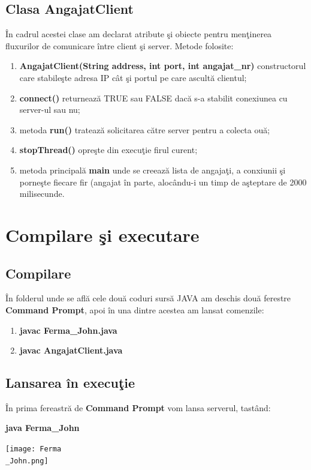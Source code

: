 \documentclass[12pt,a4paper]{article}
\begin{document}
\subsection{Clasa AngajatClient}
	\^{I}n cadrul acestei clase am declarat atribute \c{s}i obiecte pentru men\c{t}inerea fluxurilor de comunicare \^{i}ntre client \c{s}i server.
	Metode folosite:
	\begin{enumerate}
		\item \textbf{AngajatClient(String address, int port, int angajat\_nr)} constructorul care stabile\c{s}te adresa IP c\^{a}t \c{s}i portul pe care ascult\u{a} clientul;
		\item \textbf{connect()} returneaz\u{a} TRUE sau FALSE dac\u{a} s-a stabilit conexiunea cu server-ul sau nu;
		\item metoda \textbf{run()} trateaz\u{a} solicitarea c\u{a}tre server pentru a colecta ou\u{a};
		\item \textbf{stopThread()} opre\c{s}te din execu\c{t}ie firul curent;
		\item metoda principal\u{a} \textbf{main} unde se creeaz\u{a} lista de angaja\c{t}i, a conxiunii \c{s}i porne\c{s}te fiecare fir (angajat \^{i}n parte, aloc\^{a}ndu-i un timp de a\c{s}teptare de 2000 milisecunde.
	\end{enumerate}
	
\section{Compilare \c{s}i executare}
\subsection{Compilare}
	\^{I}n folderul unde se afl\u{a} cele dou\u{a} coduri surs\u{a} JAVA am deschis dou\u{a} ferestre \textbf{Command Prompt}, apoi \^{i}n una dintre acestea am lansat comenzile:
	\begin{enumerate}
		\item \textbf{javac Ferma\_John.java}
		\item \textbf{javac AngajatClient.java}
	\end{enumerate}
	
\subsection{Lansarea \^{i}n execu\c{t}ie}
	\^{I}n prima fereastr\u{a} de \textbf{Command Prompt} vom lansa serverul, tast\^{a}nd: 
	\newline 
	\begin{center} \textbf{java Ferma\_John}\end{center}
	\texttt{[image: Ferma\\\_John.png]} 
	
\end{document}
